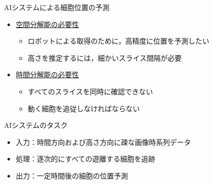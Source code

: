 \begin{frame}{AIシステムによる細胞位置の予測}
    \begin{itemize}
        \item \uline{空間分解能の必要性}
        \begin{itemize}
            \item ロボットによる取得のために，高精度に位置を予測したい
            \item 高さを推定するには，細かいスライス間隔が必要
        \end{itemize}
        \vspace{0.5zh}
        \item \uline{時間分解能の必要性}
        \begin{itemize}
            \item すべてのスライスを同時に確認できない
            \item 動く細胞を追従しなければならない
        \end{itemize}
    \end{itemize}
    \vs
    \begin{block}{AIシステムのタスク}
        \begin{itemize}
            \item 入力：時間方向および高さ方向に疎な画像時系列データ
            \item 処理：逐次的にすべての遊離する細胞を追跡
            \item 出力：一定時間後の細胞の位置予測
        \end{itemize}
    \end{block}
\end{frame}